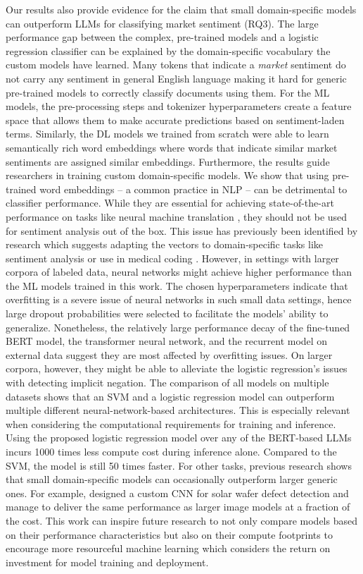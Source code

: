 Our results also provide evidence for the claim that small domain-specific models can outperform LLMs for classifying market sentiment (RQ3). The large performance gap between the complex, pre-trained models and a logistic regression classifier can be explained by the domain-specific vocabulary the custom models have learned. Many tokens that indicate a \emph{market} sentiment do not carry any sentiment in general English language making it hard for generic pre-trained models to correctly classify documents using them.  For the ML models, the pre-processing steps and tokenizer hyperparameters create a feature space that allows them to make accurate predictions based on sentiment-laden terms. Similarly, the DL models we trained from scratch were able to learn semantically rich word embeddings where words that indicate similar market sentiments are assigned similar embeddings. Furthermore, the results guide researchers in training custom domain-specific models. We show that using pre-trained word embeddings -- a common practice in NLP -- can be detrimental to classifier performance. While they are essential for achieving state-of-the-art performance on tasks like neural machine translation , they should not be used for sentiment analysis out of the box. This issue has previously been identified by research which suggests adapting the vectors to domain-specific tasks like sentiment analysis  or use in medical coding .\newline
However, in settings with larger corpora of labeled data, neural networks might achieve higher performance than the ML models trained in this work. The chosen hyperparameters indicate that overfitting is a severe issue of neural networks in such small data settings, hence large dropout probabilities were selected to facilitate the models' ability to generalize. Nonetheless, the relatively large performance decay of the fine-tuned BERT model, the transformer neural network, and the recurrent model on external data suggest they are most affected by overfitting issues. On larger corpora, however, they might be able to alleviate the logistic regression's issues with detecting implicit negation.
The comparison of all models on multiple datasets shows that an SVM and a logistic regression model can outperform multiple different neural-network-based architectures. This is especially relevant when considering the computational requirements for training and inference. Using the proposed logistic regression model over any of the BERT-based LLMs incurs 1000 times less compute cost during inference alone. Compared to the SVM, the model is still 50 times faster. For other tasks, previous research shows that small domain-specific models can occasionally outperform larger generic ones. For example,  designed a custom CNN for solar wafer defect detection and manage to deliver the same performance as larger image models at a fraction of the cost. This work can inspire future research to not only compare models based on their performance characteristics but also on their compute footprints to encourage more resourceful machine learning which considers the return on investment for model training and deployment.

